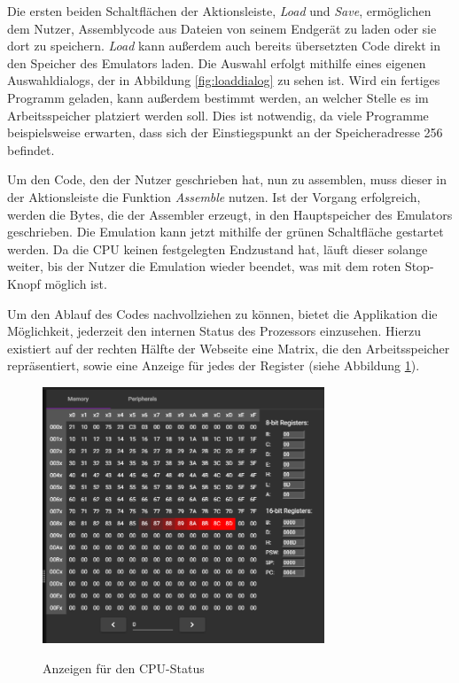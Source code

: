 Die ersten beiden Schaltflächen der Aktionsleiste, \textit{Load} und \textit{Save}, ermöglichen dem Nutzer, Assemblycode aus Dateien von seinem Endgerät zu laden oder sie dort zu speichern. \textit{Load} kann außerdem auch bereits übersetzten Code direkt in den Speicher des Emulators laden. Die Auswahl erfolgt mithilfe eines eigenen Auswahldialogs, der in Abbildung \ref{fig:loaddialog} zu sehen ist. Wird ein fertiges Programm geladen, kann außerdem bestimmt werden, an welcher Stelle es im Arbeitsspeicher platziert werden soll. Dies ist notwendig, da viele Programme beispielsweise erwarten, dass sich der Einstiegspunkt an der Speicheradresse 256 befindet.

Um den Code, den der Nutzer geschrieben hat, nun zu assemblen, muss dieser in der Aktionsleiste die Funktion \textit{Assemble} nutzen. Ist der Vorgang erfolgreich, werden die Bytes, die der Assembler erzeugt, in den Hauptspeicher des Emulators geschrieben. Die Emulation kann jetzt mithilfe der grünen Schaltfläche gestartet werden. Da die CPU keinen festgelegten Endzustand hat, läuft dieser solange weiter, bis der Nutzer die Emulation wieder beendet, was mit dem roten Stop-Knopf möglich ist.

Um den Ablauf des Codes nachvollziehen zu können, bietet die Applikation die Möglichkeit, jederzeit den internen Status des Prozessors einzusehen. Hierzu existiert auf der rechten Hälfte der Webseite eine Matrix, die den Arbeitsspeicher repräsentiert, sowie eine Anzeige für jedes der Register (siehe Abbildung \ref{fig:cpustate}).

\begin{figure}
    \caption{Anzeigen für den CPU-Status}
    \centering
    \includegraphics[width=0.75\textwidth]{Bilder/CPUState.png}
    \label{fig:cpustate}
\end{figure}

